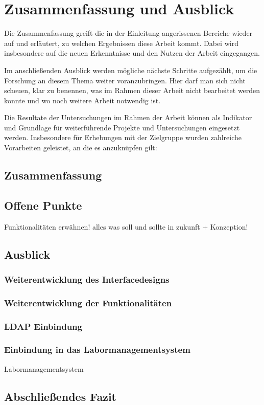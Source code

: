 
\chapter{Zusammenfassung und Ausblick}
\label{chapter-fazit}

Die Zusammenfassung greift die in der Einleitung angerissenen Bereiche wieder auf und erläutert, zu
welchen Ergebnissen diese Arbeit kommt. Dabei wird insbesondere auf die neuen Erkenntnisse und den
Nutzen der Arbeit eingegangen.

Im anschließenden Ausblick werden mögliche nächste Schritte aufgezählt, um die Forschung an diesem
Thema weiter voranzubringen. Hier darf man sich nicht scheuen, klar zu benennen, was im Rahmen
dieser Arbeit nicht bearbeitet werden konnte und wo noch weitere Arbeit notwendig ist.

Die Resultate der Untersuchungen im Rahmen der Arbeit können als Indikator und Grundlage für
weiterführende Projekte und Untersuchungen eingesetzt werden. Insbesondere für Erhebungen mit der
Zielgruppe wurden zahlreiche Vorarbeiten geleistet, an die es anzuknüpfen gilt:



\section{Zusammenfassung}

\section{Offene Punkte}
Funktionalitäten erwähnen! alles was soll und sollte in zukunft + Konzeption!

\section{Ausblick}

\subsection{Weiterentwicklung des Interfacedesigns}

\subsection{Weiterentwicklung der Funktionalitäten}
\subsection{LDAP Einbindung}

\subsection{Einbindung in das Labormanagementsystem}
Labormanagementsystem 
\section{Abschließendes Fazit}

